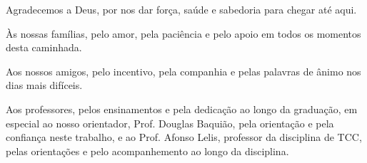\documentclass[
    12pt,                %
    openright,           %
    oneside,             %
    a4paper,             %
    english,             %
    brazil               %
]{abntex2}
\begin{document}

\frenchspacing

\pretextual

\imprimircapa

\imprimirfolhaderosto

\begin{agradecimentos}
Agradecemos a Deus, por nos dar força, saúde e sabedoria para chegar até aqui.

Às nossas famílias, pelo amor, pela paciência e pelo apoio em todos os momentos desta caminhada.

Aos nossos amigos, pelo incentivo, pela companhia e pelas palavras de ânimo nos dias mais difíceis.

Aos professores, pelos ensinamentos e pela dedicação ao longo da graduação, em especial ao nosso orientador, Prof. Douglas Baquião, pela orientação e pela confiança neste trabalho, e ao Prof. Afonso Lelis, professor da disciplina de TCC, pelas orientações e pelo acompanhemento ao longo da disciplina.
\end{agradecimentos}
\end{document}
